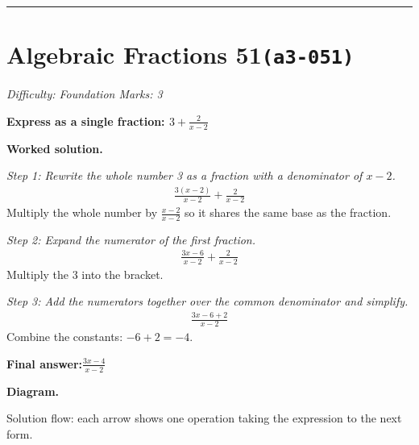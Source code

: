 \documentclass[11pt]{article}
\newcommand{\question}[1]{\par\medskip\noindent\textbf{#1}\par}
\begin{document}
\medskip\hrule

\section*{Algebraic Fractions 51\quad\small\texttt{(a3-051)}}
\textit{Difficulty: Foundation \quad\textbar\quad Marks: 3}

\question{Express as a single fraction: \( 3 + \frac{2}{x-2} \)}

\textbf{Worked solution.}

\textit{Step 1: Rewrite the whole number 3 as a fraction with a denominator of \( x-2 \).}
\[\begin{gathered}
\frac{3(x-2)}{x-2} + \frac{2}{x-2}
\end{gathered}\]
Multiply the whole number by \( \frac{x-2}{x-2} \) so it shares the same base as the fraction.

\textit{Step 2: Expand the numerator of the first fraction.}
\[\begin{gathered}
\frac{3x - 6}{x-2} + \frac{2}{x-2}
\end{gathered}\]
Multiply the 3 into the bracket.

\textit{Step 3: Add the numerators together over the common denominator and simplify.}
\[\begin{gathered}
\frac{3x - 6 + 2}{x-2}
\end{gathered}\]
Combine the constants: \( -6 + 2 = -4 \).

\begin{answerbox}
\textbf{Final answer:}\quad \(\displaystyle \frac{3x - 4}{x-2}\)
\end{answerbox}
\textbf{Diagram.}

\begin{center}
\end{center}
\small Solution flow: each arrow shows one operation taking the expression to the next form.\normalsize
\end{document}
